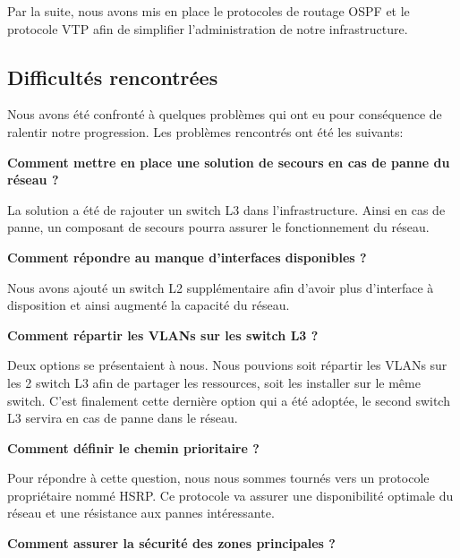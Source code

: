 \documentclass{article}
\begin{document}
        Par la suite, nous avons mis en place le protocoles de routage OSPF et le protocole VTP afin de simplifier l'administration de notre infrastructure.
        
    \subsection{Difficultés rencontrées}
    
    Nous avons été confronté à quelques problèmes qui ont eu pour conséquence de ralentir notre progression. Les problèmes rencontrés ont été les suivants:
    \newline
    
    \textbf{Comment mettre en place une solution de secours en cas de panne du réseau ?} 
     \newline
    
    La solution a été de rajouter un switch L3 dans l'infrastructure. Ainsi en cas de panne, un composant de secours pourra assurer le fonctionnement du réseau.
    \newline
    
     \textbf{Comment répondre au manque d'interfaces disponibles ?} 
     \newline
     
     Nous avons ajouté un switch L2 supplémentaire afin d'avoir plus d'interface à disposition et ainsi augmenté la capacité du réseau.
     \newline
     
      \textbf{Comment répartir les VLANs sur les switch L3 ?} 
     \newline
     
     Deux options se présentaient à nous. Nous pouvions soit répartir les VLANs sur les 2 switch L3 afin de partager les ressources, soit les installer sur le même switch.
     C'est finalement cette dernière option qui a été adoptée, le second switch L3 servira en cas de panne dans le réseau.
      \newline
     
      \textbf{Comment définir le chemin prioritaire ?} 
     \newline
     
     Pour répondre à cette question, nous nous sommes tournés vers un protocole propriétaire nommé HSRP. Ce protocole va assurer une disponibilité optimale du réseau et une résistance aux pannes intéressante.
      \newline
     
      \textbf{Comment assurer la sécurité des zones principales ?} 
     \newline
     
\end{document}
